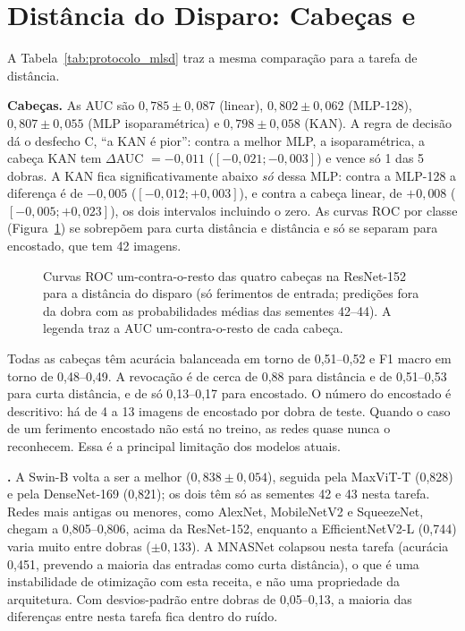 \section{Distância do Disparo: Cabeças e \texorpdfstring{}{Backbones}}
\label{sec:results_mlsd}

A Tabela~\ref{tab:protocolo_mlsd} traz a mesma comparação para a tarefa de distância.



\textbf{Cabeças.} As AUC são $0{,}785 \pm 0{,}087$ (linear), $0{,}802 \pm 0{,}062$ (MLP-128), $0{,}807 \pm 0{,}055$ (MLP isoparamétrica) e $0{,}798 \pm 0{,}058$ (KAN). A regra de decisão dá o desfecho C, ``a KAN é pior'': contra a melhor MLP, a isoparamétrica, a cabeça KAN tem $\Delta$AUC $= -0{,}011$ ($[-0{,}021; -0{,}003]$) e vence só 1 das 5 dobras. A KAN fica significativamente abaixo \emph{só} dessa MLP: contra a MLP-128 a diferença é de $-0{,}005$ ($[-0{,}012; +0{,}003]$), e contra a cabeça linear, de $+0{,}008$ ($[-0{,}005; +0{,}023]$), os dois intervalos incluindo o zero. As curvas ROC por classe (Figura~\ref{fig:roc_mlsd}) se sobrepõem para curta distância e distância e só se separam para encostado, que tem 42 imagens.

\begin{figure}[!htbp]
\centering

\caption{Curvas ROC um-contra-o-resto das quatro cabeças na ResNet-152 para a distância do disparo (só ferimentos de entrada; predições fora da dobra com as probabilidades médias das sementes 42--44). A legenda traz a AUC um-contra-o-resto de cada cabeça.}
\label{fig:roc_mlsd}
\end{figure}

Todas as cabeças têm acurácia balanceada em torno de 0,51--0,52 e F1 macro em torno de 0,48--0,49. A revocação é de cerca de 0,88 para distância e de 0,51--0,53 para curta distância, e de só 0,13--0,17 para encostado. O número do encostado é descritivo: há de 4 a 13 imagens de encostado por dobra de teste. Quando o caso de um ferimento encostado não está no treino, as redes quase nunca o reconhecem. Essa é a principal limitação dos modelos atuais.

\textbf{.} A Swin-B volta a ser a melhor ($0{,}838 \pm 0{,}054$), seguida pela MaxViT-T (0,828) e pela DenseNet-169 (0,821); os dois  têm só as sementes 42 e 43 nesta tarefa. Redes mais antigas ou menores, como AlexNet, MobileNetV2 e SqueezeNet, chegam a 0,805--0,806, acima da ResNet-152, enquanto a EfficientNetV2-L (0,744) varia muito entre dobras ($\pm 0{,}133$). A MNASNet colapsou nesta tarefa (acurácia 0,451, prevendo a maioria das entradas como curta distância), o que é uma instabilidade de otimização com esta receita, e não uma propriedade da arquitetura. Com desvios-padrão entre dobras de 0,05--0,13, a maioria das diferenças entre  nesta tarefa fica dentro do ruído.


